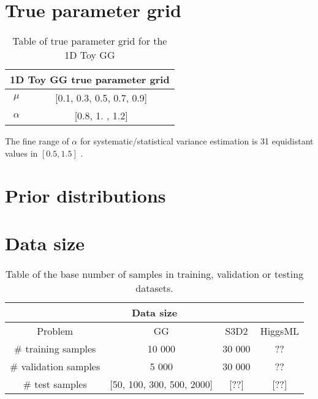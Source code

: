 \section{True parameter grid} %
\label{sec:true_parameter_grid}


\begin{table}[ht!]
\centering
\begin{tabular}{||c c||} 
 \hline
 \multicolumn{2}{|c|}{1D Toy GG true parameter grid}\\
 \hline
 $\mu$ & [0.1, 0.3, 0.5, 0.7, 0.9] \\ 
 $\alpha$ & [0.8, 1. , 1.2] \\ 
 \hline
\end{tabular}
\caption{Table of true parameter grid for the 1D Toy GG}
\label{table:GG_true_grid}
\end{table}

The fine range of $\alpha$ for systematic/statistical variance estimation is 31 equidistant values in $[0.5, 1.5]$ . 






\section{Prior distributions} %
\label{sec:prior_distributions}












\section{Data size} %
\label{sec:data_size}


\begin{table}[ht!]
\centering
\begin{tabular}{||c c c c||} 
 \hline
 \multicolumn{4}{|c|}{Data size}\\
 \hline
 Problem & GG & S3D2 & HiggsML \\ [0.5ex] 
 \hline
 \# training samples & 10 000 & 30 000 & ?? \\ 
 \# validation samples & 5 000 & 30 000 & ?? \\
 \# test samples & [50, 100, 300, 500, 2000] & [??] & [??] \\
 \hline
\end{tabular}
\caption{Table of the base number of samples in training, validation or testing datasets. }
\label{table:data_sizes}
\end{table}





